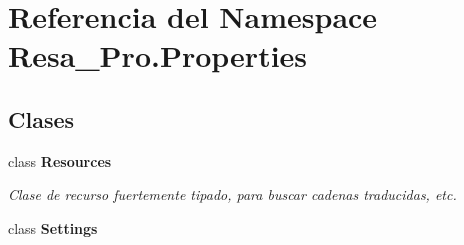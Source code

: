 \section{Referencia del Namespace Resa\+\_\+\+Pro.\+Properties}
\label{namespace_resa___pro_1_1_properties}
\subsection*{Clases}
\begin{DoxyCompactItemize}
\item 
class {\bfseries Resources}
\begin{DoxyCompactList}\small\item\em Clase de recurso fuertemente tipado, para buscar cadenas traducidas, etc. \end{DoxyCompactList}\item 
class {\bfseries Settings}
\end{DoxyCompactItemize}
